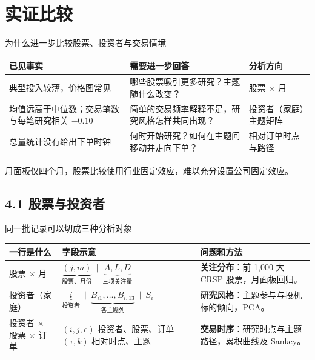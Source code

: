 \section{实证比较}

\begin{frame}[label=empirical-why]{为什么进一步比较股票、投资者与交易情境}
  \small
  \begin{tabularx}{\linewidth}{@{}L{.29\linewidth}YL{.24\linewidth}@{}}
    \toprule 已见事实 & 需要进一步回答 & 分析方向\\\midrule
    典型投入较薄，价格图常见 & 哪些股票吸引更多研究？主题随什么改变？ & 股票 \(\times\) 月\\\midrule
    均值远高于中位数；交易笔数与每笔研究相关 \(-0.10\) & 简单的交易频率解释不足，研究风格怎样共同出现？ & 投资者（家庭）主题矩阵\\\midrule
    总量统计没有给出下单时钟 & 何时开始研究？如何在主题间移动并走向下单？ & 相对订单时点与路径\\\bottomrule
  \end{tabularx}\par\medskip
  {\small 月面板仅四个月，股票比较使用行业固定效应，难以充分设置公司固定效应。}
\end{frame}

\subsection{4.1 股票与投资者}
\begin{frame}[label=slices]{同一批记录可以切成三种分析对象}
  \small
  \begin{tabularx}{\linewidth}{@{}L{.24\linewidth}YY@{}}
    \toprule 一行是什么 & 字段示意 & 问题和方法\\\midrule
    股票 \(\times\) 月 & \(\underbrace{(j,m)}_{\text{股票、月份}}\ \mid\ \underbrace{A,L,D}_{\text{三项关注量}}\) &
      \textbf{关注分布}：前 1,000 大 CRSP 股票，月面板回归。\\\midrule
    投资者（家庭） & \(\underbrace{i}_{\text{投资者}}\ \mid\ \underbrace{B_{i1},\ldots,B_{i,13}}_{\text{各主题列}}\ \mid\ S_i\) &
      \textbf{研究风格}：主题参与与投机标的倾向，PCA。\\\midrule
    投资者 \(\times\) 股票 \(\times\) 订单 &
      \((i,j,e)\) 投资者、股票、订单\newline \((\tau,k)\) 相对时点、主题 &
      \textbf{交易时序}：研究时点与主题路径，累积曲线及 Sankey。\\
    \bottomrule
  \end{tabularx}
\end{frame}

